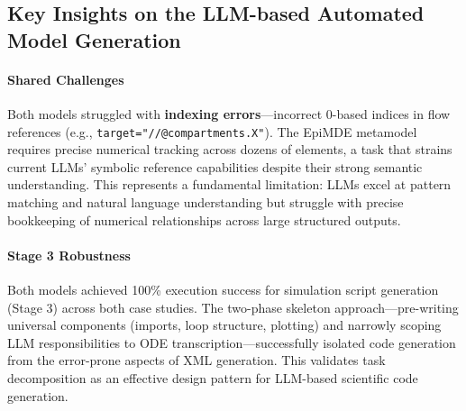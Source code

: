 
\subsection{Key Insights on the LLM-based Automated Model Generation}

\paragraph{Shared Challenges} Both models struggled with \textbf{indexing errors}—incorrect 0-based indices in flow references (e.g., \texttt{target="//@compartments.X"}). The EpiMDE metamodel requires precise numerical tracking across dozens of elements, a task that strains current LLMs' symbolic reference capabilities despite their strong semantic understanding. This represents a fundamental limitation: LLMs excel at pattern matching and natural language understanding but struggle with precise bookkeeping of numerical relationships across large structured outputs.

\paragraph{Stage 3 Robustness} Both models achieved 100\% execution success for simulation script generation (Stage 3) across both case studies. The two-phase skeleton approach—pre-writing universal components (imports, loop structure, plotting) and narrowly scoping LLM responsibilities to ODE transcription—successfully isolated code generation from the error-prone aspects of XML generation. This validates task decomposition as an effective design pattern for LLM-based scientific code generation.

